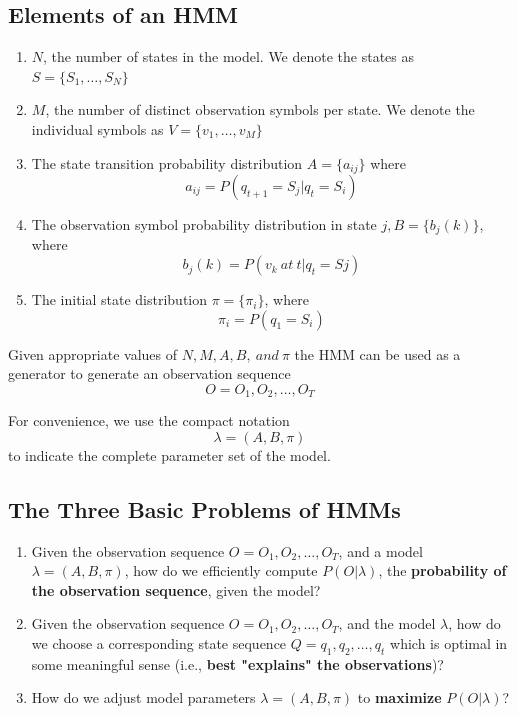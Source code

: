 \documentclass{scrartcl}
\begin{document}
\begin{appendices}
\subsection{Elements of an HMM}
\begin{enumerate}
    \item
        \(N\), the number of states in the model. We denote the states as \(S = \{S_1, \dots, S_N\}\)
    \item
        \(M\), the number of distinct observation symbols per state. We denote the individual symbols as \(V = \{v_1, \dots, v_M\}\)
    \item
        The state transition probability distribution \(A = \{a_{ij}\}\) where
        \[a_{ij} = P(q_{t+1} = S_j | q_t = S_i)\] 
    \item
        The observation symbol probability distribution in state \(j, B =\{b_j(k)\}\), where
        \[b_j(k) = P(v_k \ at \ t | q_t = Sj)\]
    \item
        The initial state distribution \(\pi = \{\pi_i\}\), where
        \[\pi_i = P(q_1 = S_i)\]
\end{enumerate}
Given appropriate values of \(N, M, A, B, \ and \ \pi\) the HMM can be used as a generator to generate an observation sequence 
\[O = O_1, O_2, \dots, O_T\]

For convenience, we use the compact notation
\[\lambda = (A, B, \pi)\]
to indicate the complete parameter set of the model.

\subsection{The Three Basic Problems of HMMs}
\begin{enumerate}
    \item
        Given the observation sequence \(O = O_1, O_2, \dots, O_T\), and a model \(\lambda = (A, B, \pi)\), how do we efficiently compute \(P(O|\lambda)\), the \textbf{probability of the observation sequence}, given the model?
    \item
        Given the observation sequence \(O=O_1, O_2, \dots, O_T\), and the model \(\lambda\), how do we choose a corresponding state sequence \(Q = q_1, q_2, \dots, q_t\) which is optimal in some meaningful sense (i.e., \textbf{best "explains" the observations})?
    \item
        How do we adjust model parameters \(\lambda = (A, B, \pi)\) to \textbf{maximize} \(P(O|\lambda)\)?
\end{enumerate}


\end{appendices}
\end{document}
